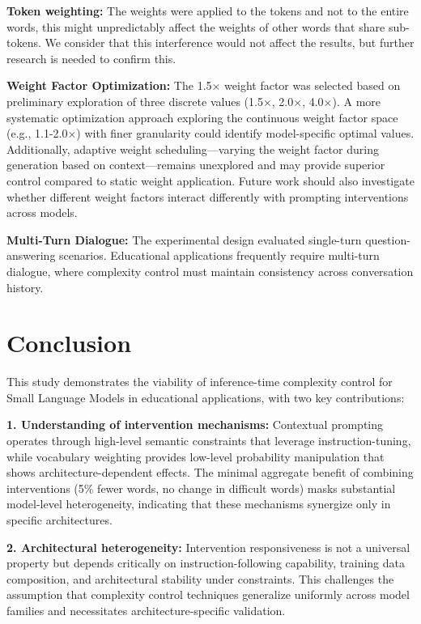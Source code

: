 \documentclass[10pt, a4paper]{article}
\begin{document}
\textbf{Token weighting:} The weights were applied to the tokens and not to the entire words, this might unpredictably affect the weights of other words that share sub-tokens. We consider that this interference would not affect the results, but further research is needed to confirm this.

\textbf{Weight Factor Optimization:} The 1.5× weight factor was selected based on preliminary exploration of three discrete values (1.5×, 2.0×, 4.0×). A more systematic optimization approach exploring the continuous weight factor space (e.g., 1.1-2.0×) with finer granularity could identify model-specific optimal values. Additionally, adaptive weight scheduling—varying the weight factor during generation based on context—remains unexplored and may provide superior control compared to static weight application. Future work should also investigate whether different weight factors interact differently with prompting interventions across models.

\textbf{Multi-Turn Dialogue:} The experimental design evaluated single-turn question-answering scenarios. Educational applications frequently require multi-turn dialogue, where complexity control must maintain consistency across conversation history.

\section{Conclusion}

This study demonstrates the viability of inference-time complexity control for Small Language Models in educational applications, with two key contributions:

\textbf{1. Understanding of intervention mechanisms:} Contextual prompting operates through high-level semantic constraints that leverage instruction-tuning, while vocabulary weighting provides low-level probability manipulation that shows architecture-dependent effects. The minimal aggregate benefit of combining interventions (5\% fewer words, no change in difficult words) masks substantial model-level heterogeneity, indicating that these mechanisms synergize only in specific architectures.

\textbf{2. Architectural heterogeneity:} Intervention responsiveness is not a universal property but depends critically on instruction-following capability, training data composition, and architectural stability under constraints. This challenges the assumption that complexity control techniques generalize uniformly across model families and necessitates architecture-specific validation.
\end{document}
